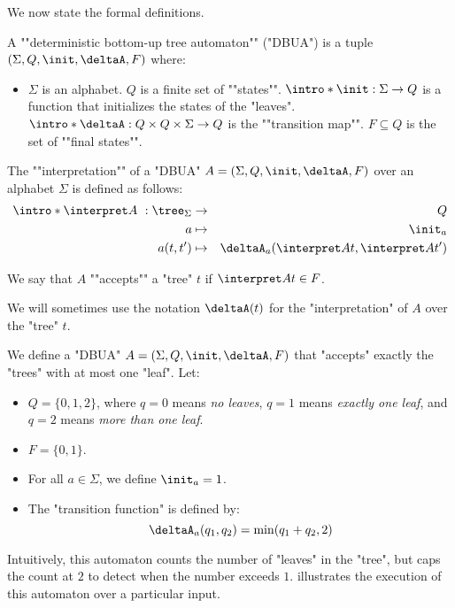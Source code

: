 \documentclass[a4paper,UKenglish,cleveref, autoref, thm-restate]{lipics-v2021}
\begin{document}
We now state the formal definitions.

\begin{definition}
	\AP A ""deterministic bottom-up tree automaton"" (\reintro*"DBUA") is a tuple $(\Sigma, Q, \init, \deltaA, F)$ where:
	\begin{itemize}
		\item $\Sigma$ is an alphabet.
		      \itemAP $Q$ is a finite set of ""states"".
		      \itemAP $\intro*\init : \Sigma \to Q$ is a function that initializes the states of the "leaves".
		      \itemAP $\intro*\deltaA : Q \times Q \times \Sigma \to Q$ is the ""transition map"".
		      \itemAP $F \subseteq Q$ is the set of ""final states"".
	\end{itemize}
\end{definition}

\begin{definition}
	\AP The ""interpretation"" of a "DBUA" $A = (\Sigma, Q, \init, \deltaA, F)$  over an alphabet $\Sigma$ is defined as follows:
	\begin{eqnarray*}
		\intro* \interpret A ~: \tree_{\Sigma} &\to& Q \\
		a &\mapsto& \init_a \\
		a(t,t') &\mapsto& \deltaA_a (\interpret A t, \interpret A {t'})
	\end{eqnarray*}

	We say that $A$ ""accepts"" a "tree" $t$ if $\interpret A t \in F$.

	We will sometimes use the notation $\deltaA(t)$ for the "interpretation" of $A$ over the "tree" $t$.
\end{definition}

\begin{example}\label{ex:count-leaves}
	We define a "DBUA" $A = (\Sigma, Q, \init, \deltaA, F)$ that "accepts" exactly the "trees" with at most one "leaf". Let:
	\begin{itemize}
		\item $Q = \{0,1,2\}$, where $q=0$ means \textit{no leaves}, $q=1$ means \textit{exactly one leaf},
		      and $q=2$ means \textit{more than one leaf}.
		\item $F = \{0,1\}$.
		\item For all $a \in \Sigma$, we define $\init_a = 1$.
		\item The "transition function" is defined by:
		      \[
			      \deltaA_a(q_1, q_2) = \min(q_1 + q_2, 2)
		      \]
	\end{itemize}

	Intuitively, this automaton counts the number of "leaves" in the "tree", but caps the count at $2$ to detect when the number exceeds $1$.
	 illustrates the execution of this automaton over a particular input.
\end{example}
\end{document}

